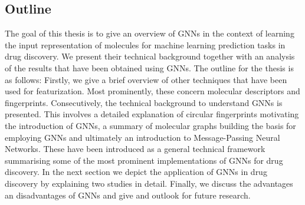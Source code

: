 \subsection{Outline}
The goal of this thesis is to give an overview of GNNs in the context of learning the input representation of molecules for machine learning prediction tasks in drug discovery. We present their technical background together with an analysis of the results that have been obtained using GNNs. The outline for the thesis is as follows:
Firstly, we give a brief overview of other techniques that have been used for featurization. Most prominently, these concern molecular descriptors and fingerprints. Consecutively, the technical background to understand GNNs is presented. This involves a detailed explanation of circular fingerprints motivating the introduction of GNNs, a summary of molecular graphs building the basis for employing GNNs and ultimately an introduction to Message-Passing Neural Networks. These have been introduced as a general technical framework summarising some of the most prominent implementations of GNNs for drug discovery. In the next section we depict the application of GNNs in drug discovery by explaining two studies in detail. Finally, we discuss the advantages an disadvantages of GNNs and give and outlook for future research. 





